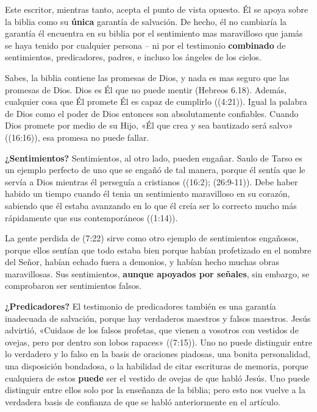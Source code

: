 \documentclass[12pt, twoside, openright]{book}
\begin{document}
Este escritor, mientras tanto, acepta el punto de vista opuesto. Él se apoya sobre la biblia como su \textbf{única} garantía de salvación. De hecho, él no cambiaría la garantía él encuentra en su biblia por el sentimiento mas maravilloso que jamás se haya tenido por cualquier persona – ni por el testimonio \textbf{combinado} de sentimientos, predicadores, padres, e incluso los ángeles de los cielos.

Sabes, la biblia contiene las promesas de Dios, y nada es mas seguro que las promesas de Dios. Dios es Él que no puede mentir (Hebreos 6.18). Además, cualquier cosa que Él promete Él es capaz de cumplirlo ((4:21)). Igual la palabra de Dios como el poder de Dios entonces son absolutamente confiables. Cuando Dios promete por medio de su Hijo, «Él que crea y sea bautizado será salvo» ((16:16)), esa promesa no puede fallar.

\textbf{¿Sentimientos?} Sentimientos, al otro lado, pueden engañar. Saulo de Tarso es un ejemplo perfecto de uno que se engañó de tal manera, porque él sentía que le servía a Dios mientras él perseguía a cristianos ((16:2); (26:9-11)). Debe haber habido un tiempo cuando él tenia un sentimiento maravilloso en su corazón, sabiendo que él estaba avanzando en lo que él creía ser lo correcto mucho más rápidamente que sus contemporáneos ((1:14)).

La gente perdida de (7:22) sirve como otro ejemplo de sentimientos engañosos, porque ellos sentían que todo estaba bien porque habían profetizado en el nombre del Señor, habían echado fuera a demonios, y habían hecho muchas obras maravillosas. Sus sentimientos, \textbf{aunque apoyados por señales}, sin embargo, se comprobaron ser sentimientos falsos.

\textbf{¿Predicadores?} El testimonio de predicadores también es una garantía inadecuada de salvación, porque hay verdaderos maestros y falsos maestros. Jesús advirtió, «Cuidaos de los falsos profetas, que vienen a vosotros con vestidos de ovejas, pero por dentro son lobos rapaces» ((7:15)). Uno no puede distinguir entre lo verdadero y lo falso en la basis de oraciones piadosas, una bonita personalidad, una disposición bondadosa, o la habilidad de citar escrituras de memoria, porque cualquiera de estos \textbf{puede} ser el vestido de ovejas de que habló Jesús. Uno puede distinguir entre ellos solo por la enseñanza de la biblia; pero esto nos vuelve a la verdadera basis de confianza de que se habló anteriormente en el artículo. 
\end{document}
